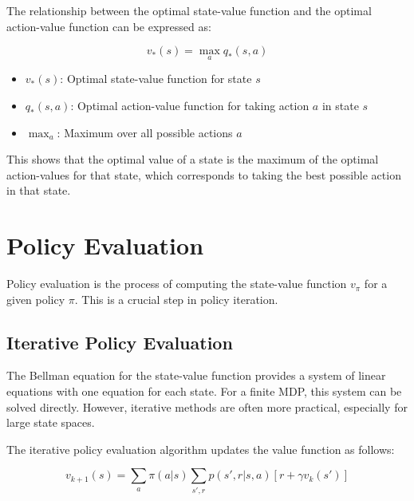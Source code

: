 \documentclass{article}
\begin{document}
The relationship between the optimal state-value function and the optimal action-value function can be expressed as:

\begin{equation}
v_*(s) = \max_a q_*(s,a)
\end{equation}

\begin{tcolorbox}[colframe=blue!50!black, colback=blue!10, title=Notation Overview]
\begin{itemize}
    \item $v_*(s)$: Optimal state-value function for state $s$
    \item $q_*(s,a)$: Optimal action-value function for taking action $a$ in state $s$
    \item $\max_a$: Maximum over all possible actions $a$
\end{itemize}
\end{tcolorbox}

This shows that the optimal value of a state is the maximum of the optimal action-values for that state, which corresponds to taking the best possible action in that state.

\section{Policy Evaluation}

Policy evaluation is the process of computing the state-value function $v_\pi$ for a given policy $\pi$. This is a crucial step in policy iteration.

\subsection{Iterative Policy Evaluation}

The Bellman equation for the state-value function provides a system of linear equations with one equation for each state. For a finite MDP, this system can be solved directly. However, iterative methods are often more practical, especially for large state spaces.

The iterative policy evaluation algorithm updates the value function as follows:

\begin{equation}
v_{k+1}(s) = \sum_a \pi(a|s) \sum_{s',r} p(s',r|s,a)[r + \gamma v_k(s')]
\end{equation}
\end{document}
